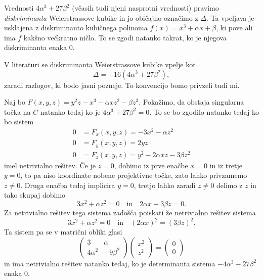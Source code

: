 \documentclass[mat1]{fmfdelo}
\theoremstyle{definition}
\begin{document}
\begin{opomba}
    Vrednosti $4\alpha^3 + 27\beta^2$ (včasih tudi njeni nasprotni vrednosti) pravimo \emph{diskriminanta} Weierstrassove kubike in jo običajno označimo z $\Delta$. Ta vpeljava je usklajena z diskriminanto kubičnega polinoma $f(x) = x^3 + \alpha x + \beta$, ki pove ali ima $f$ kakšno večkratno ničlo. To se zgodi natanko takrat, ko je njegova diskriminanta enaka $0$. 
    
    V literaturi se diskriminanta Weierstrassove kubike vpelje kot
    \[
        \Delta = -16(4\alpha^3 + 27\beta^2),
    \]
    zaradi razlogov, ki bodo jasni pozneje. To konvencijo bomo privzeli tudi mi.
\end{opomba}

\begin{dokaz}
    Naj bo $F(x,y,z) = y^2z - x^3 - \alpha xz^2 - \beta z^3$. Pokažimo, da obstaja singularna točka na $C$ natanko tedaj ko je $4\alpha^3 + 27\beta^2 = 0$. To se bo zgodilo natanko tedaj ko bo sistem
    \begin{align*}
        0 &= F_x(x,y,z) = -3x^2 - \alpha z^2\\
        0 &= F_y(x,y,z) = 2yz\\
        0 &= F_z(x,y,z) = y^2 - 2\alpha xz - 3 \beta z^2
    \end{align*}
    imel netrivialno rešitev. Če je $z = 0$, dobimo iz prve enačbe $x = 0$ in iz tretje $y = 0$, to pa niso koordinate nobene projektivne točke, zato lahko privzamemo $z \neq 0$. Druga enačba tedaj implicira $y = 0$, tretjo lahko zaradi $z \neq 0$ delimo z $z$ in tako skupaj dobimo
    \[
        3x^2 + \alpha z^2 = 0 \quad \text{in} \quad 2\alpha x - 3 \beta z = 0.   
    \]
    Za netrivialno rešitev tega sistema zadošča poiskati že netrivialno rešitev sistema
    \[
        3x^2 + \alpha z^2 = 0 \quad \text{in} \quad (2\alpha x)^2 = (3 \beta z)^2. 
    \]
    Ta sistem pa se v matrični obliki glasi
    \[
        \begin{pmatrix}
            3 & \alpha \\
            4\alpha^2 & -9\beta^2
        \end{pmatrix} 
        \begin{pmatrix}
            x^2 \\
            z^2
        \end{pmatrix}
        =
        \begin{pmatrix}
            0 \\
            0
        \end{pmatrix}
    \]
    in ima netrivialno rešitev natanko tedaj, ko je determinanta sistema $-4\alpha^3 - 27\beta^2$ enaka $0$. 
\end{dokaz}
\end{document}
